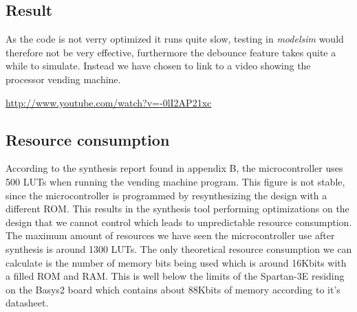 \subsection{Result}
As the code is not verry optimized it runs quite slow,
testing in \emph{modelsim} would therefore not be very effective,
furthermore the debounce feature takes quite a while to simulate.
Instead we have chosen to link to a video showing the processor vending machine.

\url{http://www.youtube.com/watch?v=-0lI2AP21xc}


\subsection{Resource consumption}
According to the synthesis report found in appendix B, the microcontroller uses 500 LUTs when running the vending machine program. 
This figure is not stable, since the microcontroller is programmed by resynthesizing the design with a different ROM.
This results in the synthesis tool performing optimizations on the design that we cannot control which leads to unpredictable resource consumption.
The maximum amount of resources we have seen the microcontroller use after synthesis is around 1300 LUTs.
The only theoretical resource consumption we can calculate is the number
of memory bits being used which is around 16Kbits with a filled ROM and RAM.
This is well below the limits of the Spartan-3E residing on the Basys2 board
which contains about 88Kbits of memory according to it's datasheet.
